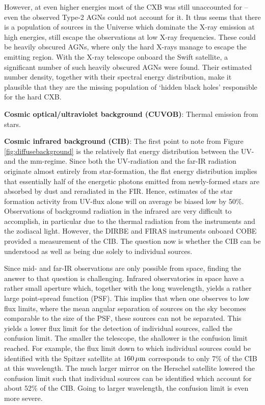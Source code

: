 \documentclass[a4paper,10pt]{article}
\begin{document}
{\noindent}However, at even higher energies most of the CXB was still unaccounted for -- even the observed Type-2 AGNs could not account for it. It thus seems that there is a population of sources in the Universe which dominate the X-ray emission at high energies, still escape the observations at low X-ray frequencies. These could be heavily obscured AGNs, where only the hard X-rays manage to escape the emitting region. With the X-ray telescope onboard the Swift satellite, a significant number of such heavily obscured AGNs were found. Their estimated number density, together with their spectral energy distribution, make it plausible that they are the missing population of `hidden black holes' responsible for the hard CXB.

{\noindent}\textbf{Cosmic optical/ultraviolet background (CUVOB)}: Thermal emission from stars.

{\noindent}\textbf{Cosmic infrared background (CIB)}: The first point to note from Figure \ref{fig:diffusebackground} is the relatively flat energy distribution between the UV- and the mm-regime. Since both the UV-radiation and the far-IR radiation originate almost entirely from star-formation, the flat energy distribution implies that essentially half of the energetic photons emitted from newly-formed stars are absorbed by dust and reradiated in the FIR. Hence, estimates of the star formation activity from UV-flux alone will on average be biased low by 50\%. Observations of background radiation in the infrared are very difficult to accomplish, in particular due to the thermal radiation from the instruments and the zodiacal light. However, the DIRBE and FIRAS instruments onboard COBE provided a measurement of the CIB. The question now is whether the CIB can be understood as well as being due solely to individual sources.

{\noindent}Since mid- and far-IR observations are only possible from space, finding the answer to that question is challenging. Infrared observatories in space have a rather small aperture which, together with the long wavelength, yields a rather large point-spread function (PSF). This implies that when one observes to low flux limits, where the mean angular separation of sources on the sky becomes comparable to the size of the PSF, these sources can not be separated. This yields a lower flux limit for the detection of individual sources, called the confusion limit. The smaller the telescope, the shallower is the confusion limit reached. For example, the flux limit down to which individual sources could be identified with the Spitzer satellite at $160\,\mu{\rm m}$ corresponds to only 7\% of the CIB at this wavelength. The much larger mirror on the Herschel satellite lowered the confusion limit such that individual sources can be identified which account for about 52\% of the CIB. Going to larger wavelength, the confusion limit is even more severe.
\end{document}
